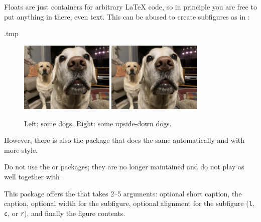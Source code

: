 Floats are just containers for arbitrary \LaTeX{} code,
so in principle you are free to put anything in there, even text.
This can be abused to create subfigures as in :
%
\begin{VerbatimOut}{\jobname.tmp}
\begin{figure}
\centering

\includegraphics[width=0.4\textwidth, alt={The two dogs.}]
  {pictures/TheDogs.jpg}
\hspace{1em}
\includegraphics[angle=180, origin=c,
    width=0.4\textwidth, alt={Same dogs upside down.}]
  {pictures/TheDogs.jpg}

\caption{Left: some dogs. Right: some upside-down dogs.}
\label{fig:hacky subfigs}
\end{figure}

\end{VerbatimOut}
\ExecuteExample

However, there is also the  package that does the same automatically
and with more style.

\begin{warning}
Do not use the  or  packages;
they are no longer maintained and do not play as well together with
.
\end{warning}

This package offers the  that takes 2--5 arguments:
optional short caption, the caption, optional width for the subfigure,
optional alignment for the subfigure (\verb|l|, \verb|c|, or \verb|r|),
and finally the figure contents.

